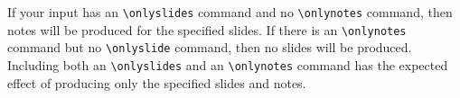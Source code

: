 If your input has an \xsp{}\hbox{\verb"\onlyslides"}\xsp{} command and
no \hbox{\verb"\onlynotes"} command, then notes will be produced for
the specified slides.  If there is an
\xsp{}\hbox{\verb"\onlynotes"}\xsp{} command but no
\xsp{}\hbox{\verb"\onlyslide"}\xsp{} command, then no slides will be
produced.  Including both an \xsp{}\hbox{\verb"\onlyslides"}\xsp{} and
an \xsp{}\hbox{\verb"\onlynotes"}\xsp{} command has the expected
effect of producing only the specified slides and notes.



